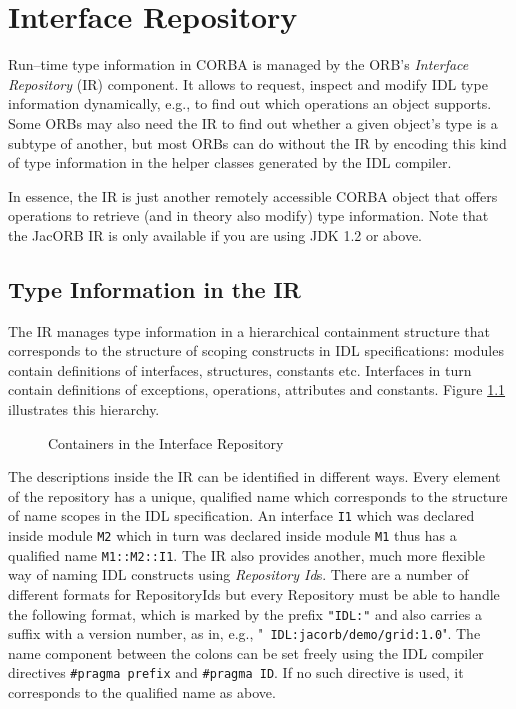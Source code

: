 \documentclass[12pt]{scrbook}
\begin{document}
\chapter{Interface Repository}
\label{ch:interface_repository}

Run--time  type information  in CORBA  is  managed by  the ORB's  {\it
Interface Repository}  (IR) component.  It allows  to request, inspect
and modify IDL  type information dynamically, e.g., to  find out which
operations an object supports. Some ORBs  may also need the IR to find
out whether  a given object's type  is a subtype of  another, but most
ORBs can do  without the IR by encoding this  kind of type information
in the helper classes generated by the IDL compiler.

In essence,  the IR is  just another remotely accessible  CORBA object
that offers  operations to retrieve  (and in theory also  modify) type
information.  Note that the  JacORB IR  is only  available if  you are
using JDK 1.2 or above.

\section{Type Information in the IR}

The  IR  manages  type   information  in  a  hierarchical  containment
structure that  corresponds to the structure of  scoping constructs in
IDL  specifications:   modules  contain  definitions   of  interfaces,
structures, constants  etc. Interfaces in turn  contain definitions of
exceptions, operations, attributes  and constants. Figure \ref{IR-fig}
illustrates this hierarchy.

\begin{figure}[htb]
\centerline{}
\caption{Containers in the Interface Repository}
\label{IR-fig}
\end{figure}

The  descriptions  inside  the  IR  can  be  identified  in  different
ways. Every  element of  the repository has  a unique,  qualified name
which  corresponds  to  the  structure  of  name  scopes  in  the  IDL
specification. An interface {\tt  I1} which was declared inside module
{\tt M2} which in turn was  declared inside module {\tt M1} thus has a
qualified name  {\tt M1::M2::I1}. The  IR also provides  another, much
more   flexible   way   of    naming   IDL   constructs   using   {\it
Repository Id}s.  There   are  a   number  of  different   formats  for
RepositoryIds  but  every  Repository  must  be  able  to  handle  the
following format, which is marked  by the prefix {\tt "IDL:"} and also
carries  a  suffix   with  a  version  number,  as   in,  e.g.,  "{\tt
IDL:jacorb/demo/grid:1.0}". The name  component between the colons can
be set freely using the  IDL compiler directives {\tt \#pragma prefix}
and {\tt \#pragma ID}. If no such directive is used, it corresponds to
the qualified name as above.
\end{document}
